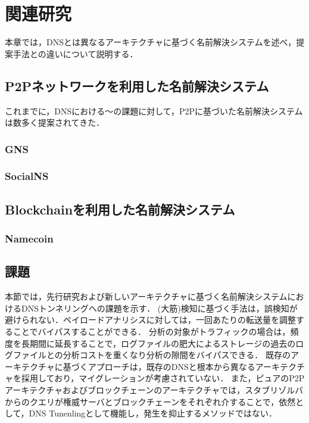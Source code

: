 \section{関連研究}
\label{sec:related-works}
本章では，DNSとは異なるアーキテクチャに基づく名前解決システムを述べ，提案手法との違いについて説明する．
\subsection{P2Pネットワークを利用した名前解決システム}
これまでに，DNSにおける〜の課題に対して，P2Pに基づいた名前解決システムは数多く提案されてきた．
\subsubsection{GNS}
\subsubsection{SocialNS}
\subsection{Blockchainを利用した名前解決システム}
\subsubsection{Namecoin}
\subsection{課題}
\label{sec:issue-past-works}
本節では，先行研究および新しいアーキテクチャに基づく名前解決システムにおけるDNSトンネリングへの課題を示す．
(大筋)検知に基づく手法は，誤検知が避けられない．ペイロードアナリシスに対しては，一回あたりの転送量を調整することでバイパスすることができる．
分析の対象がトラフィックの場合は，頻度を長期間に延長することで，ログファイルの肥大によるストレージの過去のログファイルとの分析コストを重くなり分析の隙間をバイパスできる．
既存のアーキテクチャに基づくアプローチは，既存のDNSと根本から異なるアーキテクチャを採用しており，マイグレーションが考慮されていない．
また，ピュアのP2Pアーキテクチャおよびブロックチェーンのアーキテクチャでは，スタブリゾルバからのクエリが権威サーバとブロックチェーンをそれぞれ介することで，依然として，DNS Tunenlingとして機能し，発生を抑止するメソッドではない．
